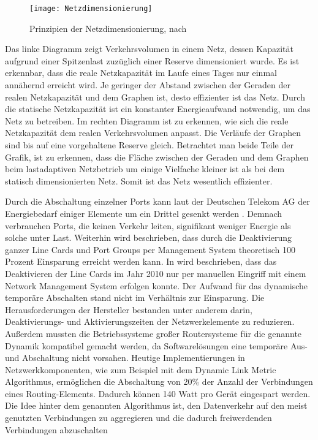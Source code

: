 \begin{figure}[htb]
	\centering
	\texttt{[image: Netzdimensionierung]}
	\caption{Prinzipien der Netzdimensionierung, nach \cite{fisher}}
	\label{fig:Netzdimensionierung}
\end{figure}

Das linke Diagramm  zeigt Verkehrsvolumen in einem Netz, dessen Kapazität aufgrund einer Spitzenlast zuzüglich einer Reserve dimensioniert wurde. Es ist erkennbar, dass die reale Netzkapazität im Laufe eines Tages nur einmal annähernd erreicht wird. Je geringer der Abstand zwischen der Geraden der realen Netzkapazität und dem Graphen ist, desto effizienter ist das Netz. Durch die statische Netzkapazität ist ein konstanter Energieaufwand notwendig, um das Netz zu betreiben. 
Im rechten Diagramm  ist zu erkennen, wie sich die reale Netzkapazität dem realen Verkehrsvolumen anpasst. Die Verläufe der Graphen sind bis auf eine vorgehaltene Reserve gleich. Betrachtet man beide Teile der Grafik, ist zu erkennen, dass die Fläche zwischen der Geraden und dem Graphen beim lastadaptiven Netzbetrieb um einige Vielfache kleiner ist als bei dem statisch dimensionierten Netz. Somit ist das Netz wesentlich effizienter.

Durch die Abschaltung einzelner Ports kann laut der Deutschen Telekom AG der Energiebedarf einiger Elemente um ein Drittel gesenkt werden \cite[4]{lange}. Demnach verbrauchen Ports, die keinen Verkehr leiten, signifikant weniger Energie als solche unter Last. Weiterhin wird beschrieben, dass durch die Deaktivierung ganzer Line Cards und Port Groups per Management System theoretisch 100 Prozent Einsparung erreicht werden kann. In  \cite{lange} wird beschrieben, dass das Deaktivieren der Line Cards im Jahr 2010 nur per manuellen Eingriff mit einem Network Management System erfolgen konnte. Der Aufwand für das dynamische temporäre Abschalten stand  nicht im Verhältnis zur Einsparung. Die Herausforderungen der Hersteller bestanden unter anderem darin, Deaktivierungs- und Aktivierungszeiten der Netzwerkelemente zu reduzieren. Außerdem mussten die Betriebssysteme großer Routersysteme für die genannte Dynamik kompatibel gemacht werden, da Softwarelösungen eine temporäre Aus- und Abschaltung nicht vorsahen.
Heutige Implementierungen in Netzwerkkomponenten, wie zum Beispiel mit dem Dynamic Link Metric Algorithmus, ermöglichen die Abschaltung von 20\% der Anzahl der Verbindungen eines Routing-Elements. Dadurch können 140 Watt pro Gerät eingespart werden\cite{keiouniversity}. Die Idee hinter dem genannten Algorithmus ist, den Datenverkehr auf den meist genutzten Verbindungen zu aggregieren und die dadurch freiwerdenden Verbindungen abzuschalten\cite[592]{survey2013} 


